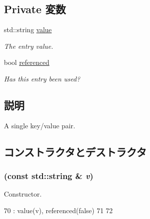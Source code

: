 \subsection*{Private 変数}
\begin{DoxyCompactItemize}
\item 
std::string \hyperlink{classIniFile_1_1Entry_a5c33da5929c9f2f9ef8d006d2350e6ec}{value}
\begin{DoxyCompactList}\small\item\em The entry value. \item\end{DoxyCompactList}\item 
bool \hyperlink{classIniFile_1_1Entry_a591be5ec02bb1171f1edde9acdbcfc50}{referenced}
\begin{DoxyCompactList}\small\item\em Has this entry been used? \item\end{DoxyCompactList}\end{DoxyCompactItemize}


\subsection{説明}
A single key/value pair. 

\subsection{コンストラクタとデストラクタ}
\hypertarget{classIniFile_1_1Entry_a38bba8135a438b494174f2d6f9c205e2}{
\subsubsection[{Entry}]{ (const std::string \& {\em v})}}
\label{classIniFile_1_1Entry_a38bba8135a438b494174f2d6f9c205e2}


Constructor. 


\begin{DoxyCode}
70             : value(v), referenced(false)
71         {
72         }
\end{DoxyCode}


